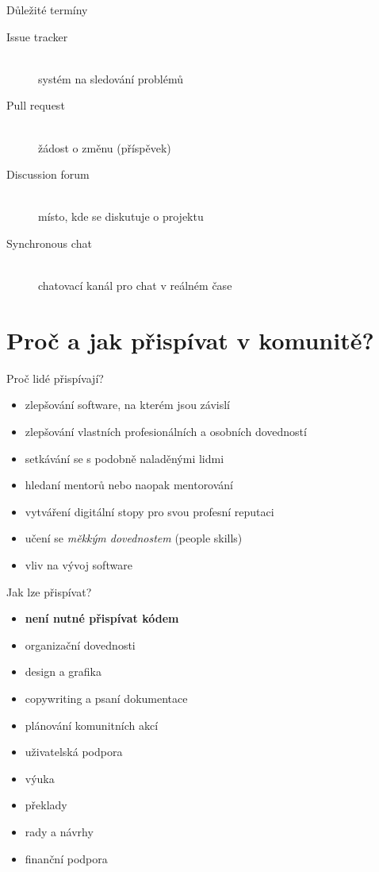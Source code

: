 \documentclass[11pt]{beamer}
\begin{document}
\begin{frame}{Důležité termíny}	
	\begin{description}
		\item[Issue tracker] \hfill \\ systém na sledování problémů
		\item[Pull request]  \hfill \\ žádost o změnu (příspěvek)
		\item[Discussion forum]  \hfill \\ místo, kde se diskutuje o projektu
		\item[Synchronous chat]  \hfill \\ chatovací kanál pro chat v reálném čase
	\end{description}
\end{frame}

\section{Proč a jak přispívat v komunitě?}

 \begin{frame}{Proč lidé přispívají?}
 	\begin{itemize}
 		\item zlepšování software, na kterém  jsou závislí
 		\item zlepšování vlastních profesionálních a osobních dovedností
 		\item setkávání se s podobně naladěnými lidmi
 		\item hledaní mentorů nebo naopak mentorování
 		\item vytváření digitální stopy pro svou profesní reputaci
 		\item učení se \textit{měkkým dovednostem} (people skills)
 		\item vliv na vývoj software
 	\end{itemize}
\end{frame}

 \begin{frame}{Jak lze přispívat?}
	\begin{itemize}
		\item \textbf{není nutné přispívat kódem}
		\item organizační dovednosti
		\item design a grafika
		\item copywriting a psaní dokumentace
		\item plánování komunitních akcí
		\item uživatelská podpora
		\item výuka
		\item překlady
		\item rady a návrhy
		\item finanční podpora
	\end{itemize}
\end{frame}
\end{document}
